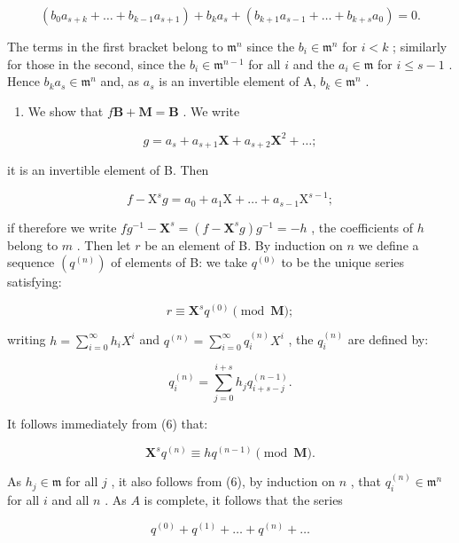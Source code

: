 \[
\left(b _ {0} a _ {s + k} + \dots + b _ {k - 1} a _ {s + 1}\right) + b _ {k} a _ {s} + \left(b _ {k + 1} a _ {s - 1} + \dots + b _ {k + s} a _ {0}\right) = 0.\tag{4}
\]

The terms in the first bracket belong to \(\mathfrak{m}^n\) since the \(b_i \in \mathfrak{m}^n\) for \(i < k\) ; similarly for those in the second, since the \(b_i \in \mathfrak{m}^{n-1}\) for all \(i\) and the \(a_i \in \mathfrak{m}\) for \(i \leqslant s - 1\) . Hence \(b_k a_s \in \mathfrak{m}^n\) and, as \(a_s\) is an invertible element of A, \(b_k \in \mathfrak{m}^n\) .

\begin{enumerate}
\def\labelenumi{(\alph{enumi})}
\setcounter{enumi}{1}
\tightlist
\item
  We show that \(f\mathbf{B} + \mathbf{M} = \mathbf{B}\) . We write
\end{enumerate}

\[
g = a _ {s} + a _ {s + 1} \mathbf {X} + a _ {s + 2} \mathbf {X} ^ {2} + \dots ;
\]

it is an invertible element of B. Then

\[
f - \mathrm{X} ^ {s} g = a _ {0} + a _ {1} \mathrm{X} + \dots + a _ {s - 1} \mathrm{X} ^ {s - 1};
\]

if therefore we write \(fg^{-1} - \mathbf{X}^s = (f - \mathbf{X}^s g)g^{-1} = -h\) , the coefficients of \(h\) belong to \(m\) . Then let \(r\) be an element of B. By induction on \(n\) we define a sequence \((q^{(n)})\) of elements of B: we take \(q^{(0)}\) to be the unique series satisfying:

\[
r \equiv \mathbf {X} ^ {s} q ^ {(0)} \pmod {\mathbf {M}};\tag{5}
\]

writing \(h = \sum_{i=0}^{\infty} h_i X^i\) and \(q^{(n)} = \sum_{i=0}^{\infty} q_i^{(n)} X^i\) , the \(q_i^{(n)}\) are defined by:

\[
q _ {i} ^ {(n)} = \sum_ {j = 0} ^ {i + s} h _ {j} q _ {i + s - j} ^ {(n - 1)}.\tag{6}
\]

It follows immediately from (6) that:

\[
\mathbf {X} ^ {s} q ^ {(n)} \equiv h q ^ {(n - 1)} \pmod {\mathbf {M}}.\tag{7}
\]

As \(h_j \in \mathfrak{m}\) for all \(j\) , it also follows from (6), by induction on \(n\) , that \(q_i^{(n)} \in \mathfrak{m}^n\) for all \(i\) and all \(n\) . As \(A\) is complete, it follows that the series

\[
q ^ {(0)} + q ^ {(1)} + \dots + q ^ {(n)} + \dots
\]

